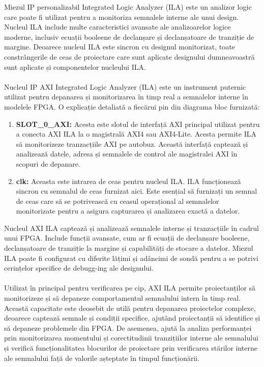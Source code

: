\documentclass[12pt]{article}
\begin{document}
\hspace*{1cm}Miezul IP personalizabil Integrated Logic Analyzer (ILA) este un analizor logic care poate fi utilizat pentru a monitoriza semnalele interne ale unui design. Nucleul ILA include multe caracteristici avansate ale analizoarelor logice moderne, inclusiv ecuații booleene de declanșare și declanșatoare de tranziție de margine. Deoarece nucleul ILA este sincron cu designul monitorizat, toate constrângerile de ceas de proiectare care sunt aplicate designului dumneavoastră sunt aplicate și componentelor nucleului ILA.\\\\
\hspace*{1cm}Nucleul IP AXI Integrated Logic Analyzer (ILA) este un instrument puternic utilizat pentru depanarea și monitorizarea în timp real a semnalelor interne în modelele FPGA. O explicație detaliată a fiecărui pin din diagrama bloc furnizată:
\begin{enumerate}
    \item \textbf{SLOT\_0\_AXI:} Acesta este slotul de interfață AXI principal utilizat pentru a conecta AXI ILA la o magistrală AXI4 sau AXI4-Lite. Acesta permite ILA să monitorizeze tranzacțiile AXI pe autobuz. Această interfață captează și analizează datele, adresa și semnalele de control ale magistralei AXI în scopuri de depanare.
    \item \textbf{clk:} Aceasta este intrarea de ceas pentru nucleul ILA. ILA funcționează sincron cu semnalul de ceas furnizat aici. Este esențial să furnizați un semnal de ceas care să se potrivească cu ceasul operațional al semnalelor monitorizate pentru a asigura capturarea și analizarea exactă a datelor.
\end{enumerate}
\hspace*{1cm}Nucleul AXI ILA captează și analizează semnalele interne și tranzacțiile în cadrul unui FPGA. Include funcții avansate, cum ar fi ecuații de declanșare booleene, declanșatoare de tranziție la margine și capabilități de stocare a datelor. Miezul ILA poate fi configurat cu diferite lățimi și adâncimi de sondă pentru a se potrivi cerințelor specifice de debugg-ing ale designului.\\\\
\hspace*{1cm}Utilizat în principal pentru verificarea pe cip, AXI ILA permite proiectanților să monitorizeze și să depaneze comportamentul semnalului intern în timp real. Această capacitate este deosebit de utilă pentru depanarea proiectelor complexe, deoarece captează semnale și condiții specifice, ajutând proiectanții să identifice și să depaneze problemele din FPGA. De asemenea, ajută la analiza performanței prin monitorizarea momentului și corectitudinii tranzițiilor interne ale semnalului și verifică funcționalitatea blocurilor de proiectare prin verificarea stărilor interne ale semnalului față de valorile așteptate în timpul funcționării.\\\\
\end{document}
